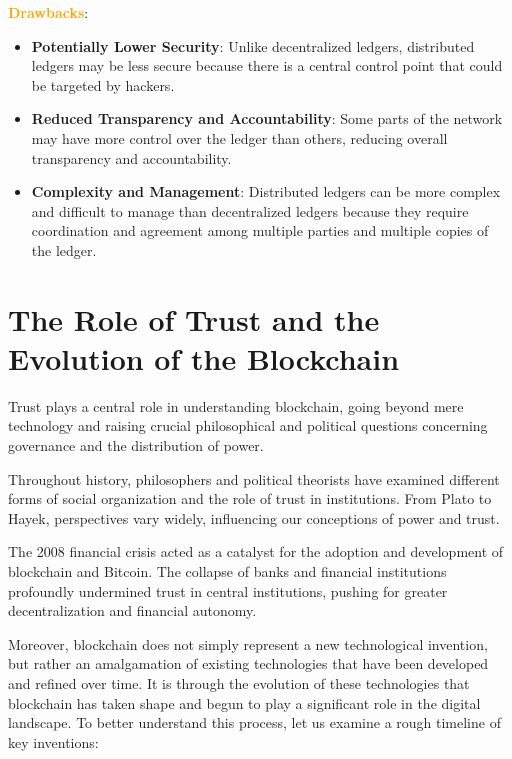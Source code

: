 \textbf{\textcolor{Orange}{Drawbacks}}:

\begin{itemize}
    \item \textbf{Potentially Lower Security}: Unlike decentralized ledgers, distributed ledgers may be less secure because there is a central control point that could be targeted by hackers.
    \item \textbf{Reduced Transparency and Accountability}: Some parts of the network may have more control over the ledger than others, reducing overall transparency and accountability.
    \item \textbf{Complexity and Management}: Distributed ledgers can be more complex and difficult to manage than decentralized ledgers because they require coordination and agreement among multiple parties and multiple copies of the ledger.
\end{itemize}


\section{The Role of Trust and the Evolution of the Blockchain}

Trust plays a central role in understanding blockchain, going beyond mere technology and raising crucial philosophical and political questions concerning governance and the distribution of power.

Throughout history, philosophers and political theorists have examined different forms of social organization and the role of trust in institutions. From Plato to Hayek, perspectives vary widely, influencing our conceptions of power and trust.

The 2008 financial crisis acted as a catalyst for the adoption and development of blockchain and Bitcoin. The collapse of banks and financial institutions profoundly undermined trust in central institutions, pushing for greater decentralization and financial autonomy.

Moreover, blockchain does not simply represent a new technological invention, but rather an amalgamation of existing technologies that have been developed and refined over time. It is through the evolution of these technologies that blockchain has taken shape and begun to play a significant role in the digital landscape. To better understand this process, let us examine a rough timeline of key inventions:

